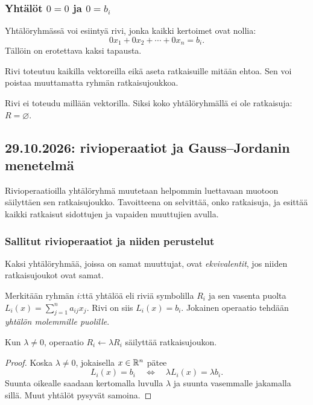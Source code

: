 \documentclass[11pt,a4paper]{amsart}
\begin{document}
  \subsubsection*{Yhtälöt $0=0$ ja $0=b_i$}

  Yhtälöryhmässä voi esiintyä rivi, jonka kaikki kertoimet ovat nollia:
  \[
    0x_1+0x_2+\cdots+0x_n=b_i.
  \]
  Tällöin on erotettava kaksi tapausta.
  \begin{description}[style=nextline,leftmargin=0pt]
    \item[$b_i=0$: yhtälö $0=0$.]
      Rivi toteutuu kaikilla vektoreilla eikä aseta ratkaisuille mitään
      ehtoa. Sen voi poistaa muuttamatta ryhmän ratkaisujoukkoa.
    \item[$b_i\ne0$: yhtälö $0=b_i$.]
      Rivi ei toteudu millään vektorilla. Siksi koko yhtälöryhmällä
      ei ole ratkaisuja: $\boxed{R=\varnothing}$.
  \end{description}

  \subsection{29.10.2026: rivioperaatiot ja Gauss--Jordanin menetelmä}

  Rivioperaatioilla yhtälöryhmä muutetaan helpommin luettavaan muotoon
  säilyttäen sen ratkaisujoukko. Tavoitteena on selvittää, onko ratkaisuja,
  ja esittää kaikki ratkaisut sidottujen ja vapaiden muuttujien avulla.

  \subsubsection*{Sallitut rivioperaatiot ja niiden perustelut}

  \begin{definition}
    Kaksi yhtälöryhmää, joissa on samat muuttujat, ovat
    \emph{ekvivalentit}, jos niiden ratkaisujoukot ovat samat.
  \end{definition}

  Merkitään ryhmän $i$:ttä yhtälöä eli riviä symbolilla $R_i$ ja sen
  vasenta puolta $L_i(x)=\sum_{j=1}^n a_{ij}x_j$. Rivi on siis
  $L_i(x)=b_i$. Jokainen operaatio tehdään \emph{yhtälön molemmille puolille}.

  \begin{lemma}
    Kun $\lambda\ne0$, operaatio $R_i\leftarrow\lambda R_i$
    säilyttää ratkaisujoukon.
  \end{lemma}
  \begin{proof}
    Koska $\lambda\ne0$, jokaisella $x\in\mathbb{R}^n$ pätee
    \[
      L_i(x)=b_i\quad\Longleftrightarrow\quad
      \lambda L_i(x)=\lambda b_i.
    \]
    Suunta oikealle saadaan kertomalla luvulla $\lambda$ ja suunta
    vasemmalle jakamalla sillä. Muut yhtälöt pysyvät samoina.
  \end{proof}
\end{document}
